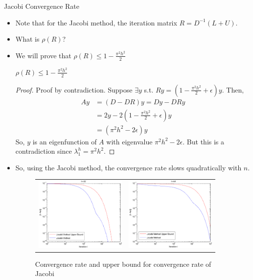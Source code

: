 \documentclass{beamer}
\begin{document}
\begin{frame}[allowframebreaks]{Jacobi Convergence Rate}
 \begin{itemize}
  \item Note that for the Jacobi method, the iteration matrix $R=D^{-1}(L+U)$.
  \item What is $\rho(R)$?
  \item We will prove that $\rho(R) \leq 1-\frac{\pi^2 h^2}{2}$
  \pagebreak
  \begin{theorem}
   $\rho(R) \leq 1-\frac{\pi^2 h^2}{2}$
   
   \begin{proof}
    Proof by contradiction. Suppose $\exists y$ s.t. $Ry = (1-\frac{\pi^2 h^2}{2}+\epsilon)y$.
    Then,
    \begin{align}
     Ay &= (D-DR)y = Dy-DRy \nonumber \\
        &= 2y - 2(1-\frac{\pi^2 h^2}{2}+\epsilon)y \nonumber \\
        &= (\pi^2 h^2 - 2 \epsilon) y
    \end{align}
    So, $y$ is an eigenfunction of $A$ with eigenvalue $\pi^2 h^2 - 2 \epsilon$.
    But this is a contradiction since $\lambda^h_1 = \pi^2 h^2$.
   \end{proof}
  \end{theorem}
  \pagebreak
  \item So, using the Jacobi method, the convergence rate slows quadratically
        with $n$.
  \begin{figure}
   \begin{tabular}{cc}
    \includegraphics[width=4.5cm]{images/jacobiConvergence_32.pdf} & \includegraphics[width=4.5cm]{images/jacobiConvergence_64.pdf}
   \end{tabular}
   \caption{Convergence rate and upper bound for convergence rate of Jacobi
}
\end{figure}
\end{itemize}
\end{frame}
\end{document}
